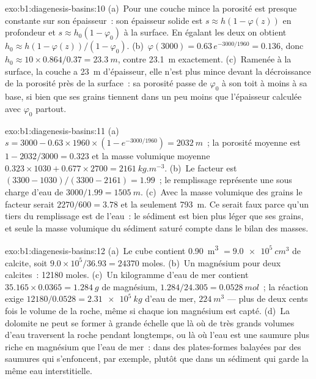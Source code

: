 \begin{solution}{exo:b1:diagenesis-basins:10}
(a)~Pour une couche mince la porosité est presque constante sur son épaisseur~: son épaisseur
solide est $s \approx h(1 - \varphi(z))$ en profondeur et $s \approx h_0(1 -
\varphi_0)$ à la surface. En égalant les deux on obtient $h_0 \approx h(1 -
\varphi(z))/(1 - \varphi_0)$. (b)~$\varphi(3000) = 0.63\,e^{-3000/1960} =
0.136$, donc $h_0 \approx 10\times0.864/0.37 = \qty{23.3}{m}$, contre
\qty{23.1}{m} exactement. (c)~Ramenée à la surface, la couche a
\qty{23}{m} d'épaisseur, elle n'est plus mince devant la décroissance de la porosité près de la
surface~: sa porosité passe de $\varphi_0$ à son toit à moins à sa base, si bien que
ses grains tiennent dans un peu moins que l'épaisseur calculée avec $\varphi_0$
partout.
\end{solution}

\begin{solution}{exo:b1:diagenesis-basins:11}
(a)~$s = 3000 - 0.63\times1960\times(1 - e^{-3000/1960}) = \qty{2032}{m}$~; la
porosité moyenne est $1 - 2032/3000 = \num{0.323}$ et la masse volumique moyenne
$0.323\times1030 + 0.677\times2700 = \qty{2161}{kg.m^{-3}}$. (b)~Le facteur est
$(3300 - 1030)/(3300 - 2161) = \num{1.99}$~; le remplissage représente une 
sous charge d'eau de $3000/1.99 = \qty{1505}{m}$. (c)~Avec la masse volumique des grains le facteur
serait $2270/600 = \num{3.78}$ et la  seulement \qty{793}{m}. Ce serait
faux parce qu'un tiers du remplissage est de l'eau~: le sédiment est bien plus léger que ses
grains, et seule la masse volumique du sédiment saturé compte dans le bilan des
masses.
\end{solution}

\begin{solution}{exo:b1:diagenesis-basins:12}
(a)~Le cube contient \qty{0.90}{m^3} $= \qty{9.0e5}{cm^3}$ de calcite, soit
$9.0\times10^5/36.93 = \num{24370}$ moles. (b)~Un magnésium pour deux calcites~:
\num{12180} moles. (c)~Un kilogramme d'eau de mer contient $35.165\times0.0365 =
\qty{1.284}{g}$ de magnésium, $1.284/24.305 = \qty{0.0528}{mol}$~; la réaction
exige $12180/0.0528 = \qty{2.31e5}{kg}$ d'eau de mer, $\qty{224}{m^3}$ --- plus
de deux cents fois le volume de la roche, même si chaque ion magnésium est
capté. (d)~La dolomite ne peut se former à grande échelle que là où de très grands volumes
d'eau traversent la roche pendant longtemps, ou là où l'eau est une saumure
plus riche en magnésium que l'eau de mer~: dans des plates-formes balayées par des saumures qui s'enfoncent,
par exemple, plutôt que dans un sédiment qui garde la même eau interstitielle.
\end{solution}


